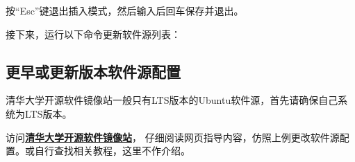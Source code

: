 按“Esc”键退出插入模式，然后输入后回车保存并退出。

接下来，运行以下命令更新软件源列表：

\subsection{更早或更新版本软件源配置}

清华大学开源软件镜像站一般只有LTS版本的Ubuntu软件源，首先请确保自己系统为LTS版本。

访问\textbf{\textcolor{blue}{\href{https://mirrors.tuna.tsinghua.edu.cn/help/ubuntu/}{清华大学开源软件镜像站}}}，
仔细阅读网页指导内容，仿照上例更改软件源配置。或自行查找相关教程，这里不作介绍。

